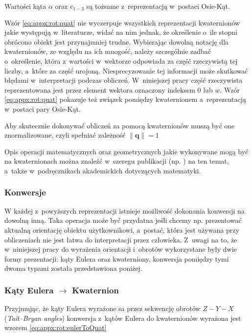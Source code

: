 Wartości kąta $\alpha$ oraz $e_{1-3}$ są tożsame z~reprezentacją w~postaci Osie-Kąt.
																													
Wzór \ref{eq:appx:rot:quat} nie wyczerpuje wszystkich reprezentacji kwaternionów jakie występują w~literaturze, widać na nim jednak, że określenie o~ile stopni obrócono obiekt jest przynajmniej trudne. Wybierając dowolną notację dla kwaternionów, ze względu na ich mnogość, należy szczególnie zadbać o~określenie, która z~wartości w~wektorze odpowiada za część rzeczywistą tej liczby, a~które za część urojoną. Niesprecyzowanie tej informacji może skutkować błędami w~interpretacji podczas obliczeń. W~niniejszej pracy część rzeczywista reprezentowana jest przez element wektora oznaczony indeksem $0$ lub $w$. Wzór \ref{eq:appx:rot:quat} pokazuje też związek pomiędzy kwaternionem a~reprezentacją w~postaci pary Osie-Kąt.
																													
Aby skutecznie dokonywać obliczeń za pomocą kwaternionów muszą być one znormalizowane, czyli spełniać zależność $\|\mathbf{q}\| = 1$
																													
Opis operacji matematycznych oraz geometrycznych jakie wykonywane mogą być na kwaternionach można znaleźć w~szeregu publikacji (np. \cite{Dantam2014}) na ten temat, a~także w~podręcznikach akademickich dotyczących matematyki.
																													
\subsubsection*{Konwersje}
W każdej z~powyższych reprezentacji istnieje możliwość dokonania konwersji na dowolną inną. Taka operacja może być przydatna jeśli chcemy np. prezentować aktualną orientację obiektu użytkownikowi, a~postać, która jest używana przy obliczeniach nie jest łatwa do interpretacji przez człowieka. Z~uwagi na to, że w~niniejszej pracy do wyrażenia orientacji i~obrotów wykorzystane były dwie formy prezentacji: kąty Eulera oraz kwaterniony, konwersja pomiędzy tymi dwoma typami została przedstawiona poniżej.
																													
\subsubsection*{Kąty Eulera $\rightarrow$ Kwaternion}
Przyjmując, że kąty Eulera wyrażone sa przez sekwencję obrotów $Z-Y-X$ (\emph{Tait–Bryan angles}) konwersja z~kątów Eulera do kwaternionów wyrażona jest wzorem \ref{eq:appx:rot:eulerToQuat}
																													
